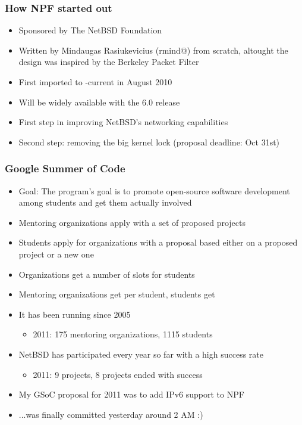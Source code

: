 \documentclass{beamer}
\begin{document}
\begin{frame}
\frametitle{How NPF started out}
\begin{itemize}
	\item Sponsored by The NetBSD Foundation
	\item Written by Mindaugas Rasiukevicius (rmind@) from scratch, altought the design was inspired by the Berkeley Packet Filter
	\item First imported to -current in August 2010
	\item Will be widely available with the 6.0 release
	\item First step in improving NetBSD's networking capabilities
	\item Second step: removing the big kernel lock (proposal deadline: Oct 31st)
\end{itemize}
\end{frame}

\begin{frame}
\frametitle{Google Summer of Code}
\begin{itemize}
	\item Goal: The program's goal is to promote open-source software development among students and get them actually involved
\pause
	\item Mentoring organizations apply with a set of proposed projects
\pause
	\item Students apply for organizations with a proposal based either on a proposed project or a new one
\pause
	\item Organizations get a number of slots for students
\pause
	\item Mentoring organizations get  per student, students get 
\pause
	\item It has been running since 2005
		\begin{itemize}
			\item 2011: 175 mentoring organizations, 1115 students
		\end{itemize}
	\item NetBSD has participated every year so far with a high success rate
		\begin{itemize}
			\item 2011: 9 projects, 8 projects ended with success
		\end{itemize}
	\item My GSoC proposal for 2011 was to add IPv6 support to NPF
	\item ...was finally committed yesterday around 2 AM :)
\end{itemize}
\end{frame}
\end{document}
